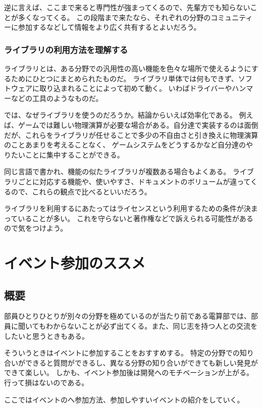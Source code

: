 \documentclass[lualatex,ja=standard,12pt,a4j]{bxjsbook}
\begin{document}
                逆に言えば、ここまで来ると専門性が強まってくるので、先輩方でも知らないことが多くなってくる。
                この段階まで来たなら、それぞれの分野のコミュニティーに参加するなどして情報をより広く共有するとよいだろう。
				
			\subsubsection{ライブラリの利用方法を理解する}
		        ライブラリとは、ある分野での汎用性の高い機能を色々な場所で使えるようにするためにひとつにまとめられたものだ。
		        ライブラリ単体では何もできず、ソフトウェアに取り込まれることによって初めて動く。
		        いわばドライバーやハンマーなどの工具のようなものだ。
		        
		        では、なぜライブラリを使うのだろうか。結論からいえば効率化である。
		        例えば、ゲームでは難しい物理演算が必要な場合がある。自分達で実装するのは面倒だが、これらをライブラリが任せることで多少の不自由さと引き換えに物理演算のことあまりを考えることなく、
		        ゲームシステムをどうするかなど自分達のやりたいことに集中することができる。
		        
		        同じ言語で書かれ、機能の似たライブラリが複数ある場合もよくある。
		        ライブラリごとに対応する機能や、使いやすさ、ドキュメントのボリュームが違ってくるので、これらの観点で比べるといいだろう。 
		        
		        ライブラリを利用するにあたってはライセンスという利用するための条件が決まっていることが多い。
		        これを守らないと著作権などで訴えられる可能性があるので気をつけよう。           
		\section{イベント参加のススメ}
			\subsection{概要}
				部員ひとりひとりが別々の分野を極めているのが当たり前である電算部では、部員に聞いてもわからないことが必ず出てくる。また、同じ志を持つ人との交流をしたいと思うときもある。
				
				そういうときはイベントに参加することをおすすめする。
				特定の分野での知り合いができると質問ができるし、異なる分野の知り合いができても新しい発見ができて楽しい。
				しかも、イベント参加後は開発へのモチベーションが上がる。
				行って損はないのである。
				
				ここではイベントのへ参加方法、参加しやすいイベントの紹介をしていく。
\end{document}

